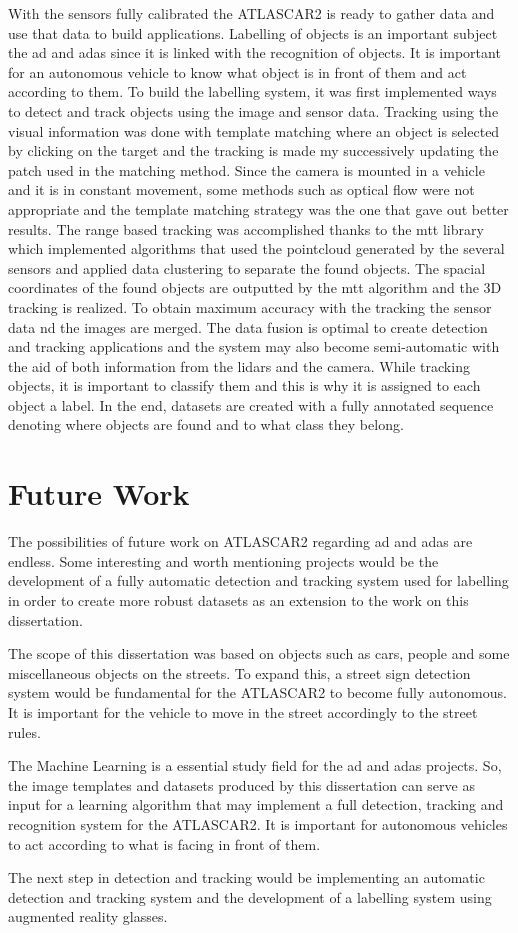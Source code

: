 With the sensors fully calibrated the ATLASCAR2 is ready to gather data and use that data to build applications. Labelling of objects is an important subject the \gls{ad} and \gls{adas} since it is linked with the recognition of objects. It is important for an autonomous vehicle to know what object is in front of them and act according to them. To build the labelling system, it was first implemented ways to detect and track objects using the image and sensor data. Tracking using the visual information was done with template matching where an object is selected by clicking on the target and the tracking is made my successively updating the patch used in the matching method. Since the camera is mounted in a vehicle and it is in constant movement, some methods such as optical flow were not appropriate and the template matching strategy was the one that gave out better results. The range based tracking was accomplished thanks to the \gls{mtt} library which implemented algorithms that used the pointcloud generated by the several sensors and applied data clustering to separate the found objects. The spacial coordinates of the found objects are outputted by the \gls{mtt} algorithm and the 3D tracking is realized. To obtain maximum accuracy with the tracking the sensor data nd the images are merged. The data fusion is optimal to create detection and tracking applications and the system may also become semi-automatic with the aid of both information from the \gls{lidar}s and the camera. While tracking objects, it is important to classify them and this is why it is assigned to each object a label. In the end, datasets are created with a fully annotated sequence denoting where objects are found and to what class they belong. 

\section{Future Work}

The possibilities of future work on ATLASCAR2 regarding \gls{ad} and \gls{adas} are endless. Some interesting and worth mentioning projects would be the development of a fully automatic detection and tracking system used for labelling in order to create more robust datasets as an extension to the work on this dissertation. 

The scope of this dissertation was based on objects such as cars, people and some miscellaneous objects on the streets. To expand this, a street sign detection system would be fundamental for the ATLASCAR2 to become fully autonomous. It is important for the vehicle to move in the street accordingly to the street rules.

The Machine Learning is a essential study field for the \gls{ad} and \gls{adas} projects. So, the image templates and datasets produced by this dissertation can serve as input for a learning algorithm that may implement a full detection, tracking and recognition system for the ATLASCAR2. It is important for autonomous vehicles to act according to what is facing in front of them.

The next step in detection and tracking would be implementing an automatic detection and tracking system and the development of a labelling system using augmented reality glasses.


